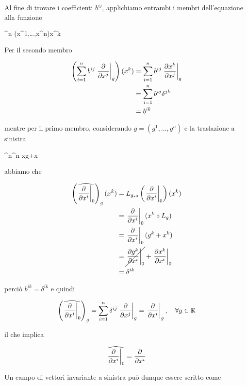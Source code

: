 Al fine di trovare i coefficienti $ b^{ij} $, applichiamo entrambi i membri dell'equazione alla funzione

%
	{\R^{n}}{\R}%
	{(x^{1},\dots,x^{n})}{x^{k}}

Per il secondo membro

\begin{align}
	\begin{split}
		\left( \sum_{i=1}^{n} b^{ij} \eval{ \pdv{x^{j}} }_{g} \right) (x^{k}) &= \sum_{i=1}^{n} b^{ij} \eval{ \pdv{x^{k}}{x^{j}} }_{g}\\
		&= \sum_{i=1}^{n} b^{ij} \delta^{jk}\\
		&= b^{ik}
	\end{split}
\end{align}

mentre per il primo membro, considerando $ g = (g^{1},\dots,g^{n}) $ e la traslazione a sinistra

%
	{\R^{n}}{\R^{n}}%
	{x}{g+x}

abbiamo che

\begin{align}
	\begin{split}
		\left( \widehat{ \eval{ \pdv{x^{i}} }_{0} } \right)_{g} (x^{k}) &= L_{g_{*0}} \left( \eval{ \pdv{x^{i}} }_{0} \right) (x^{k})\\
		&= \eval{ \pdv{x^{i}} }_{0} (x^{k} \circ L_{g})\\
		&= \eval{ \pdv{x^{i}} }_{0} (g^{k} + x^{k})\\
		&= \cancel{ \eval{ \pdv{g^{k}}{x^{i}} }_{0} } + \eval{ \pdv{x^{k}}{x^{i}} }_{0}\\
		&= \delta^{ik}
	\end{split}
\end{align}

perciò $ b^{ik} = \delta^{ik} $ e quindi

\begin{equation}
	\left( \widehat{ \eval{ \pdv{x^{i}} }_{0} } \right)_{g} = \sum_{i=1}^{n} \delta^{ij} \eval{ \pdv{x^{j}} }_{g} = \eval{ \pdv{x^{i}} }_{g} \qcomma \forall g \in \R
\end{equation}

il che implica

\begin{equation}
	\widehat{ \eval{ \pdv{x^{i}} }_{0} } = \pdv{x^{i}}
\end{equation}

Un campo di vettori invariante a sinistra può dunque essere scritto come

